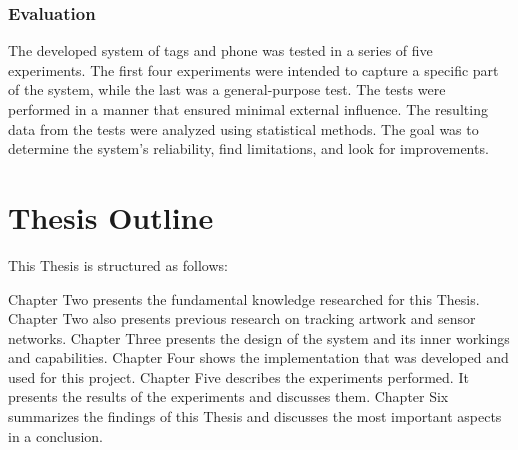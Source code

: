 \subsubsection{Evaluation}
The developed system of tags and phone was tested in a series of five experiments.
The first four experiments were intended to capture a specific part of the system, while the last was a general-purpose test.
The tests were performed in a manner that ensured minimal external influence.
The resulting data from the tests were analyzed using statistical methods.
The goal was to determine the system's reliability, find limitations, and look for improvements.

\section{Thesis Outline}

This Thesis is structured as follows:

Chapter Two presents the fundamental knowledge researched for this Thesis. 
Chapter Two also presents previous research on tracking artwork and sensor networks.
Chapter Three presents the design of the system and its inner workings and capabilities.
Chapter Four shows the implementation that was developed and used for this project.
Chapter Five describes the experiments performed. It presents the results of the experiments and discusses them.
Chapter Six summarizes the findings of this Thesis and discusses the most important aspects in a conclusion.


%
%
%
%
%
%
